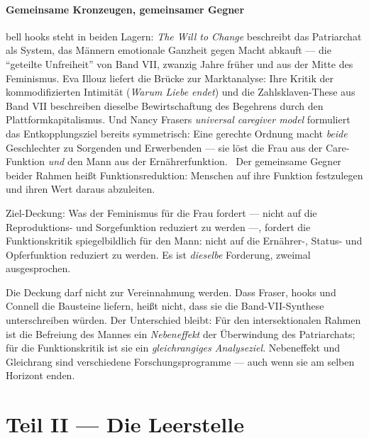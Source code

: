 \subsection{Gemeinsame Kronzeugen, gemeinsamer Gegner}

bell hooks steht in beiden Lagern: \textit{The Will to Change} beschreibt das
Patriarchat als System, das Männern emotionale Ganzheit gegen Macht abkauft ---
die \enquote{geteilte Unfreiheit} von Band VII, zwanzig Jahre früher und aus
der Mitte des Feminismus. Eva Illouz liefert die Brücke zur Marktanalyse: Ihre
Kritik der kommodifizierten Intimität (\textit{Warum Liebe endet}) und die
Zahlsklaven-These aus Band VII beschreiben dieselbe Bewirtschaftung des
Begehrens durch den Plattformkapitalismus. Und Nancy Frasers
\textit{universal caregiver model} formuliert das Entkopplungsziel bereits
symmetrisch: Eine gerechte Ordnung macht \emph{beide} Geschlechter zu
Sorgenden und Erwerbenden --- sie löst die Frau aus der Care-Funktion
\emph{und} den Mann aus der Ernährerfunktion. \belegt\ Der gemeinsame Gegner
beider Rahmen heißt Funktionsreduktion: Menschen auf ihre Funktion
festzulegen und ihren Wert daraus abzuleiten.

\begin{merksatz}
Ziel-Deckung: Was der Feminismus für die Frau fordert --- nicht auf die
Reproduktions- und Sorgefunktion reduziert zu werden ---, fordert die
Funktionskritik spiegelbildlich für den Mann: nicht auf die Ernährer-, Status-
und Opferfunktion reduziert zu werden. Es ist \emph{dieselbe} Forderung,
zweimal ausgesprochen.
\end{merksatz}

\begin{gegen}
Die Deckung darf nicht zur Vereinnahmung werden. Dass Fraser, hooks und
Connell die Bausteine liefern, heißt nicht, dass sie die Band-VII-Synthese
unterschreiben würden. Der Unterschied bleibt: Für den intersektionalen
Rahmen ist die Befreiung des Mannes ein \emph{Nebeneffekt} der Überwindung des
Patriarchats; für die Funktionskritik ist sie ein \emph{gleichrangiges
Analyseziel}. Nebeneffekt und Gleichrang sind verschiedene
Forschungsprogramme --- auch wenn sie am selben Horizont enden.
\end{gegen}

\part*{Teil II --- Die Leerstelle}

